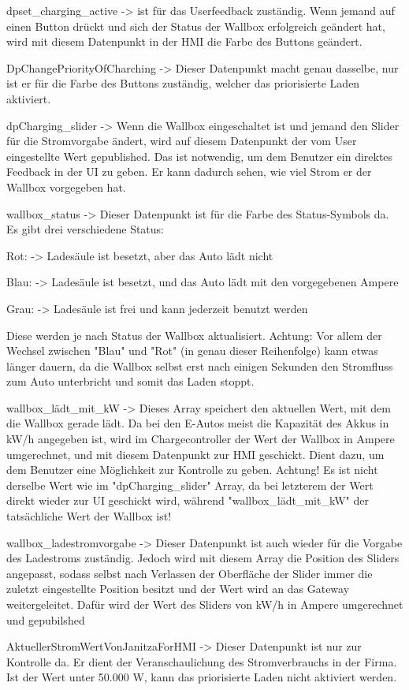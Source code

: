 \begin{compactitem}
  \item dpset\_charging\_active -> ist für das Userfeedback zuständig. Wenn jemand auf einen Button drückt und sich der Status der Wallbox erfolgreich geändert hat, wird mit diesem Datenpunkt in der HMI die Farbe des Buttons geändert.   
  \item DpChangePriorityOfCharching -> Dieser Datenpunkt macht genau dasselbe, nur ist er für die Farbe des Buttons zuständig, welcher das priorisierte Laden aktiviert.  
  \item dpCharging\_slider -> Wenn die Wallbox eingeschaltet ist und jemand den Slider für die Stromvorgabe ändert, wird auf diesem Datenpunkt der vom User eingestellte Wert gepublished. Das ist notwendig, um dem Benutzer ein direktes Feedback in der UI zu geben. Er kann dadurch sehen, wie viel Strom er der Wallbox vorgegeben hat. 
  \item wallbox\_status -> Dieser Datenpunkt ist für die Farbe des Status-Symbols da. Es gibt drei verschiedene Status: 
  \begin{compactitem}
    \item Rot: -> Ladesäule ist besetzt, aber das Auto lädt nicht 
    \item Blau: -> Ladesäule ist besetzt, und das Auto lädt mit den vorgegebenen Ampere   
    \item Grau: -> Ladesäule ist frei und kann jederzeit benutzt werden 
  \end{compactitem}
  Diese werden je nach Status der Wallbox aktualisiert. Achtung: Vor allem der Wechsel zwischen "Blau" und "Rot" (in genau dieser Reihenfolge) kann etwas länger dauern, da die Wallbox selbst erst nach einigen Sekunden den Stromfluss zum Auto unterbricht und somit das Laden stoppt. 

 \item wallbox\_lädt\_mit\_kW -> Dieses Array speichert den aktuellen Wert, mit dem die Wallbox gerade lädt. Da bei den E-Autos meist die Kapazität des Akkus in kW/h angegeben ist, wird im Chargecontroller der Wert der Wallbox in Ampere umgerechnet, und mit diesem Datenpunkt zur HMI geschickt. Dient dazu, um dem Benutzer eine Möglichkeit zur Kontrolle zu geben. Achtung! Es ist nicht derselbe Wert wie im "dpCharging\_slider" Array, da bei letzterem der Wert direkt wieder zur UI geschickt wird, während "wallbox\_lädt\_mit\_kW" der tatsächliche Wert der Wallbox ist!  
 \item wallbox\_ladestromvorgabe -> Dieser Datenpunkt ist auch wieder für die Vorgabe des Ladestroms zuständig. Jedoch wird mit diesem Array die Position des Sliders angepasst, sodass selbst nach Verlassen der Oberfläche der Slider immer die zuletzt eingestellte Position besitzt und der Wert wird an das Gateway weitergeleitet. Dafür wird der Wert des Sliders von kW/h in Ampere umgerechnet und gepubilshed  
 \item AktuellerStromWertVonJanitzaForHMI -> Dieser Datenpunkt ist nur zur Kontrolle da. Er dient der Veranschaulichung des Stromverbrauchs in der Firma. Ist der Wert unter 50.000 W, kann das priorisierte Laden nicht aktiviert werden. 
\end{compactitem}


